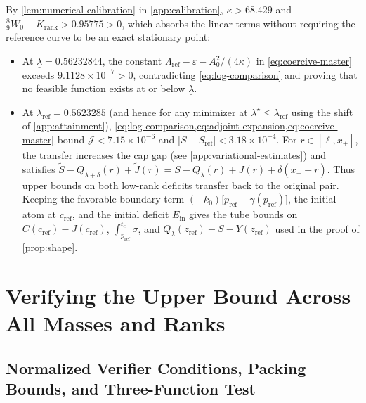 \documentclass[11pt]{article}
\numberwithin{equation}{section}
\theoremstyle{plain}
\theoremstyle{definition}
\newcommand{\1}{\mathbf{1}}
\newcommand{\calJ}{\mathcal{J}}
\begin{document}
By \cref{lem:numerical-calibration} in \cref{app:calibration}, $\kappa > 68.429$ and $\frac{8}{9}W_0 - K_{\mathrm{rank}} > 0.95775 > 0$, which absorbs the linear terms without requiring the reference curve to be an exact stationary point:
\begin{itemize}
  \item At $\underline{\lambda} = 0.56232844$, the constant $\Lambda_{\mathrm{ref}} - \varepsilon - A_0^2/(4\kappa)$ in \cref{eq:coercive-master} exceeds $9.1128 \times 10^{-7} > 0$, contradicting \cref{eq:log-comparison} and proving that no feasible function exists at or below $\underline{\lambda}$.
  \item At $\lambda_{\mathrm{ref}} = 0.5623285$ (and hence for any minimizer at $\lambda^\star \le \lambda_{\mathrm{ref}}$ using the shift of \cref{app:attainment}), \cref{eq:log-comparison,eq:adjoint-expansion,eq:coercive-master} bound $\calJ < 7.15 \times 10^{-6}$ and $|S - S_{\mathrm{ref}}| < 3.18 \times 10^{-4}$. For $r\in[\ell,x_+]$, the transfer increases the cap gap (see \cref{app:variational-estimates}) and satisfies $\widetilde S-Q_{\lambda+\delta}(r)+\widetilde J(r)=S-Q_\lambda(r)+J(r)+\delta(x_+-r)$. Thus upper bounds on both low-rank deficits transfer back to the original pair. Keeping the favorable boundary term $(-k_0)\bigl[p_{\mathrm{ref}} - \gamma(p_{\mathrm{ref}})\bigr]$, the initial atom at $c_{\mathrm{ref}}$, and the initial deficit $E_{\mathrm{in}}$ gives the tube bounds on $C(c_{\mathrm{ref}}) - J(c_{\mathrm{ref}})$, $\int_{p_{\mathrm{ref}}}^{t_e} \sigma$, and $Q_\lambda(z_{\mathrm{ref}}) - S - Y(z_{\mathrm{ref}})$ used in the proof of \cref{prop:shape}.
\end{itemize}

\section{Verifying the Upper Bound Across All Masses and Ranks}
\label{app:upper-all}

\subsection{Normalized Verifier Conditions, Packing Bounds, and Three-Function Test}
\label{app:verifier-proof}
\end{document}
